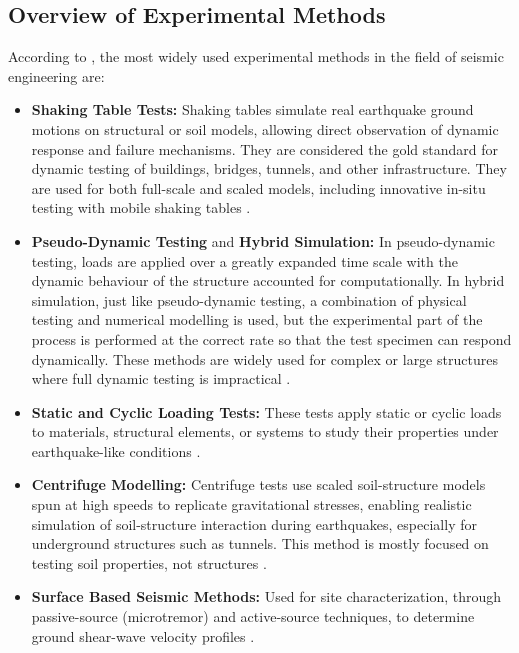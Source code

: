 \documentclass[10pt]{extarticle}
\begin{document}
\subsection{Overview of Experimental Methods}
According to \cite{williams2001}, the most widely used experimental methods in the field of seismic engineering are:
\begin{itemize}
    \item \textbf{Shaking Table Tests:} Shaking tables simulate real earthquake ground motions on structural or soil models, allowing direct observation of dynamic response and failure mechanisms. They are considered the gold standard for dynamic testing of buildings, bridges, tunnels, and other infrastructure. 
    They are used for both full-scale and scaled models, including innovative in-situ testing with mobile shaking tables \citep{williams2001,Bousias2017Experimental,Abovyan2024Method,Tsinidis2020Seismic,DeFelice2016Methods,El-Emam2018Experimental}. 
    \item \textbf{Pseudo-Dynamic Testing} and \textbf{Hybrid Simulation:} In pseudo-dynamic testing, loads are applied over a greatly expanded time scale with the dynamic behaviour of the structure accounted for computationally. In hybrid simulation, just like pseudo-dynamic testing, a combination of physical testing and numerical modelling is used, but the experimental part of the process is performed at the correct rate so that the test specimen can respond dynamically. These methods are widely used for complex or large structures where full dynamic testing is impractical \citep{williams2001,Bousias2017Experimental}.
    \item \textbf{Static and Cyclic Loading Tests:} These tests apply static or cyclic loads to materials, structural elements, or systems to study their properties under earthquake-like conditions \citep{williams2001,Bousias2017Experimental,Fiorino2016Experimental}.
    \item \textbf{Centrifuge Modelling:} Centrifuge tests use scaled soil-structure models spun at high speeds to replicate gravitational stresses, enabling realistic simulation of soil-structure interaction during earthquakes, especially for underground structures such as tunnels. This method is mostly focused on testing soil properties, not structures \citep{williams2001,Tsinidis2020Seismic}.
    \item \textbf{Surface Based Seismic Methods:} Used for site characterization, through passive-source (microtremor) and active-source techniques, to determine ground shear-wave velocity profiles \citep{Luke2008Characterizing}.

\end{itemize}
\end{document}
